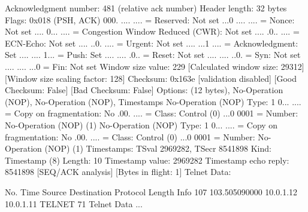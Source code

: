     Acknowledgment number: 481    (relative ack number)
    Header length: 32 bytes
    Flags: 0x018 (PSH, ACK)
        000. .... .... = Reserved: Not set
        ...0 .... .... = Nonce: Not set
        .... 0... .... = Congestion Window Reduced (CWR): Not set
        .... .0.. .... = ECN-Echo: Not set
        .... ..0. .... = Urgent: Not set
        .... ...1 .... = Acknowledgment: Set
        .... .... 1... = Push: Set
        .... .... .0.. = Reset: Not set
        .... .... ..0. = Syn: Not set
        .... .... ...0 = Fin: Not set
    Window size value: 229
    [Calculated window size: 29312]
    [Window size scaling factor: 128]
    Checksum: 0x163e [validation disabled]
        [Good Checksum: False]
        [Bad Checksum: False]
    Options: (12 bytes), No-Operation (NOP), No-Operation (NOP), Timestamps
        No-Operation (NOP)
            Type: 1
                0... .... = Copy on fragmentation: No
                .00. .... = Class: Control (0)
                ...0 0001 = Number: No-Operation (NOP) (1)
        No-Operation (NOP)
            Type: 1
                0... .... = Copy on fragmentation: No
                .00. .... = Class: Control (0)
                ...0 0001 = Number: No-Operation (NOP) (1)
        Timestamps: TSval 2969282, TSecr 8541898
            Kind: Timestamp (8)
            Length: 10
            Timestamp value: 2969282
            Timestamp echo reply: 8541898
    [SEQ/ACK analysis]
        [Bytes in flight: 1]
Telnet
    Data: 

No.     Time           Source                Destination           Protocol Length Info
    107 103.505090000  10.0.1.12             10.0.1.11             TELNET   71     Telnet Data ...

